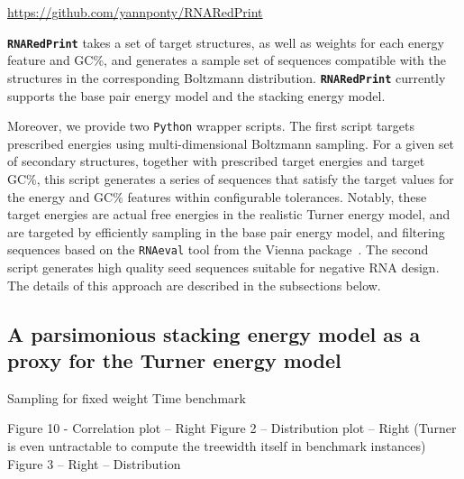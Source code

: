 \documentclass[]{bmcart}
\newcommand{\Nuc}[1]{{\sf #1}}
\newcommand{\Cb}{\Nuc{C}}
\newcommand{\Gb}{\Nuc{G}}
\newcommand{\GCb}{\Gb\Cb}
\newcommand{\ourprog}{{\tt \bfseries{}\color{black!85}RNA\textcolor{red!70!black}{Red}Print}}
\begin{document}
{\centering \url{https://github.com/yannponty/RNARedPrint}\\[.3em]}%

\ourprog{}  takes a set of target structures, as well as
weights for each energy feature and \GCb\%, and generates a sample set of sequences compatible with the structures in the corresponding
Boltzmann distribution. \ourprog{} currently supports the base pair
energy model and the stacking energy model.

Moreover, we provide two {\tt Python} wrapper scripts. The first script targets prescribed energies using multi-dimensional Boltzmann sampling.
For a given set of secondary structures, together with prescribed target energies
and target \GCb\%, this script generates a series of sequences that satisfy the target values for the energy and
\GCb\% features within configurable tolerances.
Notably, these target energies are actual free energies in the realistic
Turner energy model, and are targeted by efficiently sampling in the
base pair energy model, and filtering sequences based on the {\tt RNAeval} tool from the Vienna package~\cite{Lorenz2011}. The second script generates high quality seed sequences suitable for negative RNA design. The details of this approach are described in the subsections below.

\subsection*{A parsimonious stacking energy model as a proxy for the Turner energy model}

Sampling for fixed weight
Time benchmark

Figure 10 - Correlation plot -- Right
Figure 2 -- Distribution plot -- Right (Turner is even untractable to compute the treewidth itself in benchmark instances)
Figure 3 -- Right -- Distribution 
\end{document}
